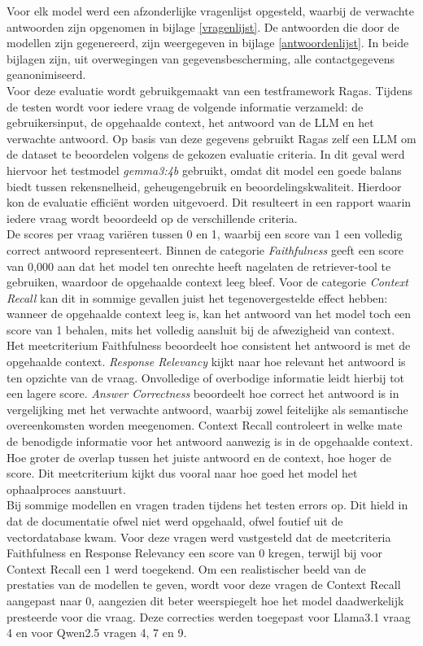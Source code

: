 Voor elk model werd een afzonderlijke vragenlijst opgesteld, waarbij de verwachte antwoorden zijn opgenomen in bijlage \ref{vragenlijst}.
De antwoorden die door de modellen zijn gegenereerd, zijn weergegeven in bijlage \ref{antwoordenlijst}.
In beide bijlagen zijn, uit overwegingen van gegevensbescherming, alle contactgegevens geanonimiseerd.
\\[1em]
Voor deze evaluatie wordt gebruikgemaakt van een testframework Ragas. Tijdens de testen wordt voor iedere vraag de volgende informatie verzameld: de gebruikersinput, de opgehaalde context, het antwoord van de LLM en het verwachte antwoord. Op basis van deze gegevens gebruikt Ragas zelf een LLM om de dataset te beoordelen volgens de gekozen evaluatie criteria. In dit geval werd hiervoor het testmodel \textit{gemma3:4b} gebruikt, omdat dit model een goede balans biedt tussen rekensnelheid, geheugengebruik en beoordelingskwaliteit. Hierdoor kon de evaluatie efficiënt worden uitgevoerd. Dit resulteert in een rapport waarin iedere vraag wordt beoordeeld op de verschillende criteria.
\\[1em]
De scores per vraag variëren tussen 0 en 1, waarbij een score van 1 een volledig correct antwoord representeert.
Binnen de categorie \textit{Faithfulness} geeft een score van 0{,}000 aan dat het model ten onrechte heeft nagelaten de retriever-tool te gebruiken, waardoor de opgehaalde context leeg bleef.
Voor de categorie \textit{Context Recall} kan dit in sommige gevallen juist het tegenovergestelde effect hebben: wanneer de opgehaalde context leeg is, kan het antwoord van het model toch een score van 1 behalen, mits het volledig aansluit bij de afwezigheid van context.
\\[1em]
Het meetcriterium Faithfulness beoordeelt hoe consistent het antwoord is met de opgehaalde context. \textit{Response Relevancy} kijkt naar hoe relevant het antwoord is ten opzichte van de vraag. Onvolledige of overbodige informatie leidt hierbij tot een lagere score. \textit{Answer Correctness} beoordeelt hoe correct het antwoord is in vergelijking met het verwachte antwoord, waarbij zowel feitelijke als semantische overeenkomsten worden meegenomen. Context Recall controleert in welke mate de benodigde informatie voor het antwoord aanwezig is in de opgehaalde context. Hoe groter de overlap tussen het juiste antwoord en de context, hoe hoger de score. Dit meetcriterium kijkt dus vooral naar hoe goed het model het ophaalproces aanstuurt.
\\[1em]
Bij sommige modellen en vragen traden tijdens het testen errors op. Dit hield in dat de documentatie ofwel niet werd opgehaald, ofwel foutief uit de vectordatabase kwam. Voor deze vragen werd vastgesteld dat de meetcriteria Faithfulness en Response Relevancy een score van 0 kregen, terwijl bij voor Context Recall een 1 werd toegekend. Om een realistischer beeld van de prestaties van de modellen te geven, wordt voor deze vragen de Context Recall aangepast naar 0, aangezien dit beter weerspiegelt hoe het model daadwerkelijk presteerde voor die vraag. Deze correcties werden toegepast voor Llama3.1 vraag 4 en voor Qwen2.5 vragen 4, 7 en 9.
